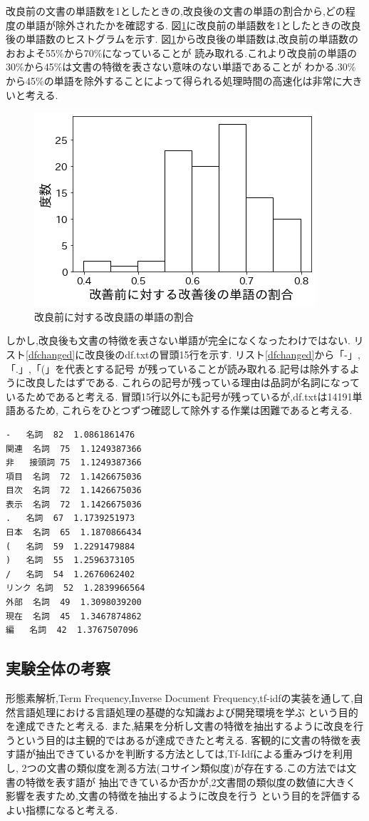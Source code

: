 \documentclass[a4j]{jarticle}
\begin{document}
改良前の文書の単語数を1としたときの,改良後の文書の単語の割合から,どの程度の単語が除外されたかを確認する.
図\ref{histgram}に改良前の単語数を1としたときの改良後の単語数のヒストグラムを示す.
図\ref{histgram}から改良後の単語数は,改良前の単語数のおおよそ55\%から70\%になっていることが
読み取れる.これより改良前の単語の30\%から45\%は文書の特徴を表さない意味のない単語であることが
わかる.30\%から45\%の単語を除外することによって得られる処理時間の高速化は非常に大きいと考える.
\begin{figure}[H]
	\centering
	\includegraphics[scale=0.75]{histgram.png}
	\caption{改良前に対する改良語の単語の割合}
   \label{histgram}
  \end{figure}

しかし,改良後も文書の特徴を表さない単語が完全になくなったわけではない.
リスト\ref{dfchanged}に改良後のdf.txtの冒頭15行を示す.
リスト\ref{dfchanged}から「-」,「.」,「(」を代表とする記号
が残っていることが読み取れる.記号は除外するように改良したはずである.
これらの記号が残っている理由は品詞が名詞になっているためであると考える.
冒頭15行以外にも記号が残っているが,df.txtは14191単語あるため,
これらをひとつずつ確認して除外する作業は困難であると考える.
\begin{lstlisting}[basicstyle=\ttfamily\footnotesize, frame=single,label=dfchanged,caption=df.txtの出力内容(改良後)]
-	名詞	82	1.0861861476
関連	名詞	75	1.1249387366
非	接頭詞	75	1.1249387366
項目	名詞	72	1.1426675036
目次	名詞	72	1.1426675036
表示	名詞	72	1.1426675036
.	名詞	67	1.1739251973
日本	名詞	65	1.1870866434
(	名詞	59	1.2291479884
)	名詞	55	1.2596373105
/	名詞	54	1.2676062402
リンク	名詞	52	1.2839966564
外部	名詞	49	1.3098039200
現在	名詞	45	1.3467874862
編	名詞	42	1.3767507096
\end{lstlisting}

\subsection{実験全体の考察}
形態素解析,Term Frequency,Inverse Document Frequency,tf-idfの実装を通して,自然言語処理における言語処理の基礎的な知識および開発環境を学ぶ
という目的を達成できたと考える.
また,結果を分析し文書の特徴を抽出するように改良を行うという目的は主観的ではあるが達成できたと考える.
客観的に文書の特徴を表す語が抽出できているかを判断する方法としては,Tf-Idfによる重みづけを利用し,
2つの文書の類似度を測る方法(コサイン類似度)が存在する.この方法では文書の特徴を表す語が
抽出できているか否かが,2文書間の類似度の数値に大きく影響を表すため,文書の特徴を抽出するように改良を行う
という目的を評価するよい指標になると考える.
\end{document}
